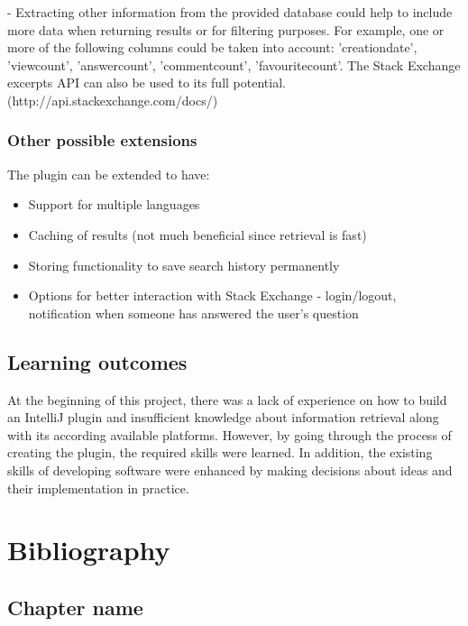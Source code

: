 \documentclass{l4proj}
\begin{document}
- Extracting other information from the provided database could help to include more data when returning results or for filtering purposes. For example, one or more of the following columns could be taken into account: 'creationdate', 'viewcount', 'answercount', 'commentcount', 'favouritecount'. The Stack Exchange excerpts API can also be used to its full potential. (http://api.stackexchange.com/docs/)

\subsection{Other possible extensions}
The plugin can be extended to have:

\begin{itemize}
\item Support for multiple languages
\item Caching of results (not much beneficial since retrieval is fast)
\item Storing functionality to save search history permanently
\item Options for better interaction with Stack Exchange - login/logout, notification when someone has answered the user's question
\end{itemize}

\section{Learning outcomes}

At the beginning of this project, there was a lack of experience on how to build an IntelliJ plugin and insufficient knowledge about information retrieval along with its according available platforms. However, by going through the process of creating the plugin, the required skills were learned. In addition, the existing skills of developing software were enhanced by making decisions about ideas and their implementation in practice.

\chapter{Bibliography}

\begin{appendices}

\chapter{Chapter name}
\begin{verbatim}
\end{verbatim}

\end{appendices}




\end{document}
